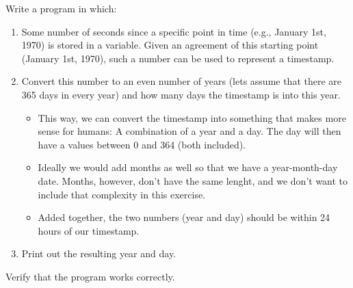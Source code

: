 Write a program in which:
\begin{enumerate}
  \item Some number of seconds since a specific point in time (e.g., January 1st, 1970) is stored in a variable. Given an agreement of this starting point (January 1st, 1970), such a number can be used to represent a timestamp.
  \item Convert this number to an even number of years (lets assume that there are 365 days in every year) and how many days the timestamp is into this year.
    \begin{itemize}
      \item This way, we can convert the timestamp into something that makes more sense for humans: A combination of a year and a day. The day will then have a values between 0 and 364 (both included).
      \item Ideally we would add months as well so that we have a year-month-day date. Months, however, don't have the same lenght, and we don't want to include that complexity in this exercise.
      \item Added together, the two numbers (year and day) should be within 24 hours of our timestamp.
    \end{itemize}
  \item Print out the resulting year and day.
\end{enumerate}

Verify that the program works correctly.

